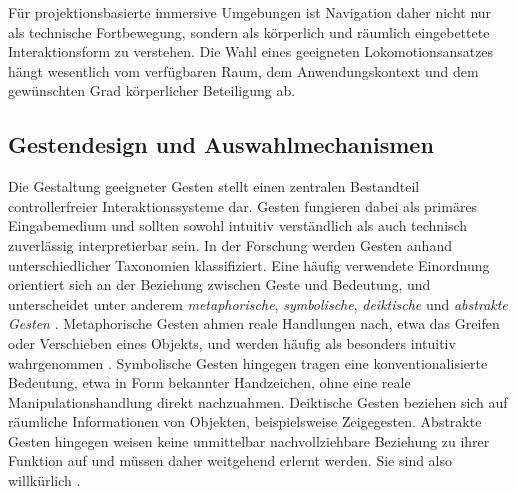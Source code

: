 Für projektionsbasierte immersive Umgebungen ist Navigation daher nicht nur als technische Fortbewegung, sondern als körperlich und räumlich eingebettete Interaktionsform zu verstehen. Die Wahl eines geeigneten Lokomotionsansatzes hängt wesentlich vom verfügbaren Raum, dem Anwendungskontext und dem gewünschten Grad körperlicher Beteiligung ab.


\subsection{Gestendesign und Auswahlmechanismen}
\label{sec:rw_gestures}

Die Gestaltung geeigneter Gesten stellt einen zentralen Bestandteil controllerfreier Interaktionssysteme dar. Gesten fungieren dabei als primäres Eingabemedium und sollten sowohl intuitiv verständlich als auch technisch zuverlässig interpretierbar sein.
In der Forschung werden Gesten anhand unterschiedlicher Taxonomien klassifiziert. Eine häufig verwendete Einordnung orientiert sich an der Beziehung zwischen Geste und Bedeutung, und unterscheidet unter anderem \textit{metaphorische}, \textit{symbolische}, \textit{deiktische} und \textit{abstrakte Gesten}  \parencite{dimSilpasuwanchai2016DesigningMidAirTvGEsturesForBlindPeople}.
Metaphorische Gesten ahmen reale Handlungen nach, etwa das Greifen oder Verschieben eines Objekts, und werden häufig als besonders intuitiv wahrgenommen \parencite{kostic2024exploringmidairhandinteractionindatavisualization}.
Symbolische Gesten hingegen tragen eine konventionalisierte Bedeutung, etwa in Form bekannter Handzeichen, ohne eine reale Manipulationshandlung direkt nachzuahmen. Deiktische Gesten beziehen sich auf räumliche Informationen von Objekten, beispielsweise Zeigegesten. Abstrakte Gesten hingegen weisen keine unmittelbar nachvollziehbare Beziehung zu ihrer Funktion auf und müssen daher weitgehend erlernt werden. Sie sind also willkürlich \parencite{dimSilpasuwanchai2016DesigningMidAirTvGEsturesForBlindPeople}.


